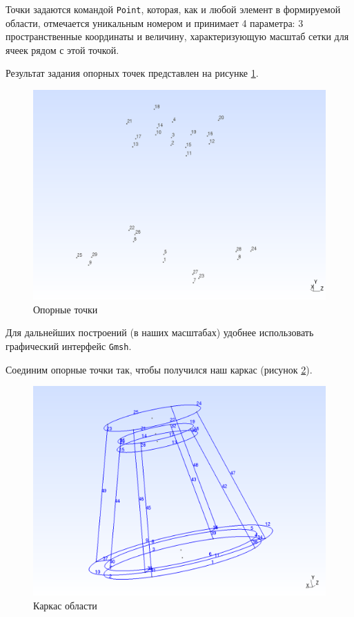 \documentclass[a4paper, 14pt]{extreport}
\begin{document}
Точки задаются командой \texttt{Point}, которая, как и любой элемент в формируемой области,
отмечается уникальным номером и принимает 4 параметра: 3 пространственные 
координаты и величину, характеризующую масштаб сетки для ячеек рядом с этой точкой.

Результат задания опорных точек представлен на рисунке \ref{fig: main_points}.
\begin{figure}
	\center
	\includegraphics[scale=0.35]{pictures/main_points.png}
	\caption{Опорные точки}
	\label{fig: main_points}
\end{figure}

Для дальнейших построений (в наших масштабах) удобнее использовать
графический интерфейс \texttt{Gmsh}.

Соединим опорные точки так, чтобы получился наш каркас (рисунок \ref{fig: skeleton}).

\begin{figure}
	\center
	\includegraphics[scale=0.35]{pictures/skeleton.png}
	\caption{Каркас области}
	\label{fig: skeleton}
\end{figure}
\end{document}

